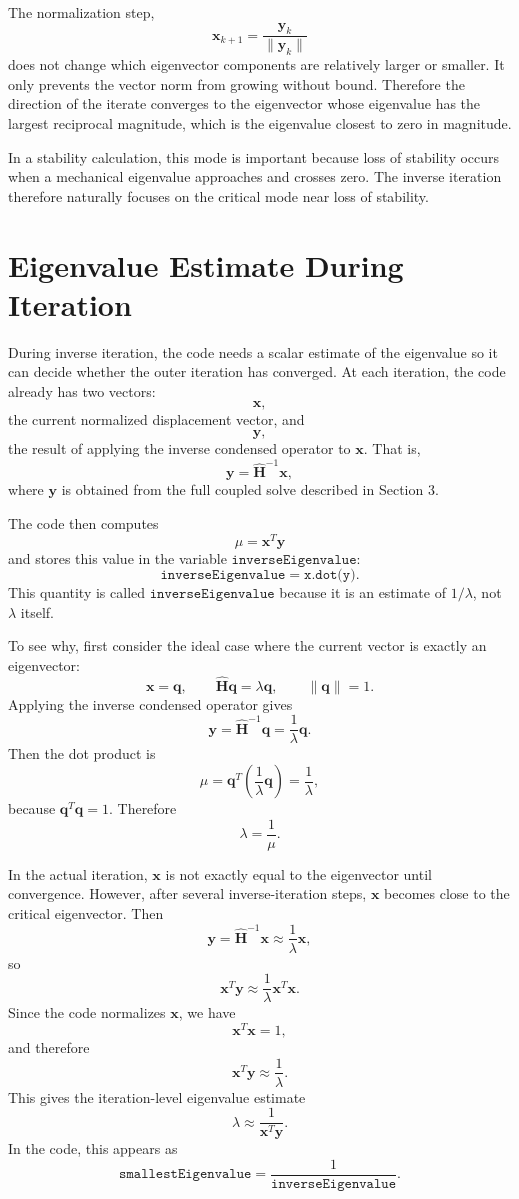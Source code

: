 \documentclass[11pt]{article}
\begin{document}
The normalization step,
\[
    \bm x_{k+1} = \frac{\bm y_k}{\|\bm y_k\|}
\]
does not change which eigenvector components are relatively larger or
smaller. It only prevents the vector norm from growing without bound.
Therefore the direction of the iterate converges to the eigenvector
whose eigenvalue has the largest reciprocal magnitude, which is the
eigenvalue closest to zero in magnitude.

In a stability calculation, this mode is important because loss of
stability occurs when a mechanical eigenvalue approaches and crosses
zero. The inverse iteration therefore naturally focuses on the critical
mode near loss of stability.

\section{Eigenvalue Estimate During Iteration}

During inverse iteration, the code needs a scalar estimate of the
eigenvalue so it can decide whether the outer iteration has converged.
At each iteration, the code already has two vectors:
\[
    \bm x,
\]
the current normalized displacement vector, and
\[
    \bm y,
\]
the result of applying the inverse condensed operator to \(\bm x\).
That is,
\[
    \bm y = \widehat{\bm H}^{-1}\bm x,
\]
where \(\bm y\) is obtained from the full coupled solve described in
Section 3.

The code then computes
\[
    \mu = \bm x^T\bm y
\]
and stores this value in the variable \(\texttt{inverseEigenvalue}\):
\[
    \texttt{inverseEigenvalue} = \texttt{x.dot(y)}.
\]
This quantity is called \(\texttt{inverseEigenvalue}\) because it is an
estimate of \(1/\lambda\), not \(\lambda\) itself.

To see why, first consider the ideal case where the current vector is
exactly an eigenvector:
\[
    \bm x = \bm q,
    \qquad
    \widehat{\bm H}\bm q = \lambda \bm q,
    \qquad
    \|\bm q\|=1.
\]
Applying the inverse condensed operator gives
\[
    \bm y =
    \widehat{\bm H}^{-1}\bm q =
    \frac{1}{\lambda}\bm q.
\]
Then the dot product is
\[
    \mu
    =
    \bm q^T
    \left(
        \frac{1}{\lambda}\bm q
    \right)
    =
    \frac{1}{\lambda},
\]
because \(\bm q^T\bm q=1\). Therefore
\[
    \lambda = \frac{1}{\mu}.
\]

In the actual iteration, \(\bm x\) is not exactly equal to the
eigenvector until convergence. However, after several inverse-iteration
steps, \(\bm x\) becomes close to the critical eigenvector. Then
\[
    \bm y
    =
    \widehat{\bm H}^{-1}\bm x
    \approx
    \frac{1}{\lambda}\bm x,
\]
so
\[
    \bm x^T\bm y
    \approx
    \frac{1}{\lambda}\bm x^T\bm x.
\]
Since the code normalizes \(\bm x\), we have
\[
    \bm x^T\bm x = 1,
\]
and therefore
\[
    \bm x^T\bm y \approx \frac{1}{\lambda}.
\]
This gives the iteration-level eigenvalue estimate
\[
    \lambda \approx \frac{1}{\bm x^T\bm y}.
\]
In the code, this appears as
\[
    \texttt{smallestEigenvalue}
    =
    \frac{1}{\texttt{inverseEigenvalue}}.
\]
\end{document}
